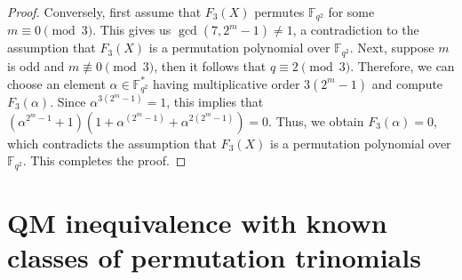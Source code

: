 \documentclass[12pt,reqno]{amsart}
\numberwithin{equation}{section}
\theoremstyle{definition}
\newcommand{\F}{\mathbb F}
\begin{document}
\begin{proof}
Conversely, first assume that $F_3(X)$ permutes $\F_{q^2}$ for some $m \equiv 0 \pmod 3$. This gives us $\gcd(7, 2^m-1) \neq 1$, a contradiction to the assumption that $F_3(X)$ is a permutation polynomial over $\F_{q^2}$. Next, suppose $m$ is odd and $m \not \equiv 0 \pmod 3$, then it follows that $q \equiv 2 \pmod 3$. Therefore, we can choose an element $\alpha \in \F_{q^2}^{*}$ having multiplicative order $3(2^m-1)$ and compute $F_3(\alpha)$. Since $\alpha^{3(2^m-1)}=1$, this implies that $ (\alpha^{2^m-1}+1)(1+\alpha^{(2^m-1)}+\alpha^{2(2^m-1)})=0$. Thus, we obtain $F_3(\alpha)=0$, which contradicts the assumption that $F_3(X)$ is a permutation polynomial over $\F_{q^2}$. This completes the proof.
\end{proof}

\section{QM inequivalence with known classes of permutation trinomials}\label{S4}
\end{document}
